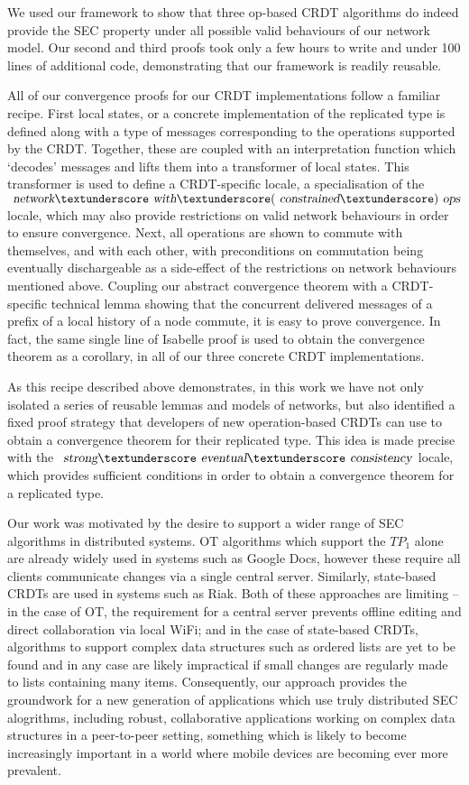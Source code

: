 \documentclass[acmlarge,review,anonymous]{acmart}
\begin{document}
We used our framework to show that three op-based CRDT algorithms do indeed provide the SEC property under all possible valid behaviours of our network model.
Our second and third proofs took only a few hours to write and under 100 lines of additional code, demonstrating that our framework is readily reusable.

All of our convergence proofs for our CRDT implementations follow a familiar recipe.
First local states, or a concrete implementation of the replicated type is defined along with a type of messages corresponding to the operations supported by the CRDT.
Together, these are coupled with an interpretation function which `decodes' messages and lifts them into a transformer of local states.
This transformer is used to define a CRDT-specific locale, a specialisation of the $\isa{network}{\isacharunderscore}\isa{with}{\isacharunderscore}(\isa{constrained}{\isacharunderscore})\isa{ops}$ locale, which may also provide restrictions on valid network behaviours in order to ensure convergence.
Next, all operations are shown to commute with themselves, and with each other, with preconditions on commutation being eventually dischargeable as a side-effect of the restrictions on network behaviours mentioned above.
Coupling our abstract convergence theorem with a CRDT-specific technical lemma showing that the concurrent delivered messages of a prefix of a local history of a node commute, it is easy to prove convergence.
In fact, the same single line of Isabelle proof is used to obtain the convergence theorem as a corollary, in all of our three concrete CRDT implementations.

As this recipe described above demonstrates, in this work we have not only isolated a series of reusable lemmas and models of networks, but also identified a fixed proof strategy that developers of new operation-based CRDTs can use to obtain a convergence theorem for their replicated type.
This idea is made precise with the $\isa{strong}{\isacharunderscore}\isa{eventual}{\isacharunderscore}\isa{consistency}$ locale, which provides sufficient conditions in order to obtain a convergence theorem for a replicated type.

Our work was motivated by the desire to support a wider range of SEC algorithms in distributed systems.
OT algorithms which support the $\mathit{TP}_1$ alone are already widely used in systems such as Google Docs, however these require all clients communicate changes via a single central server.
Similarly, state-based CRDTs are used in systems such as Riak. Both of these approaches are limiting -- in the case of OT, the requirement for a central server prevents offline editing and direct collaboration via local WiFi; and in the case of state-based CRDTs, algorithms to support complex data structures such as ordered lists are yet to be found and in any case are likely impractical if small changes are regularly made to lists containing many items.
Consequently, our approach provides the groundwork for a new generation of applications which use truly distributed SEC alogrithms, including robust, collaborative applications working on complex data structures in a peer-to-peer setting, something which is likely to become increasingly important in a world where mobile devices are becoming ever more prevalent.
\end{document}
